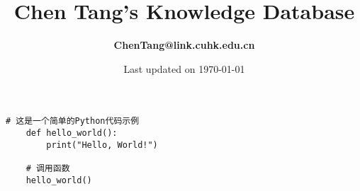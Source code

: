 \documentclass[12pt]{report}
\title{\textbf{Chen Tang's \break Knowledge Database}}
\author{\textbf{ChenTang@link.cuhk.edu.cn}}
\date{Last updated on \today}
\begin{document}
\maketitle

\clearpage
\begin{lstlisting}[caption={Your Python Code}, label={lst:python_code}]
    # 这是一个简单的Python代码示例
    def hello_world():
        print("Hello, World!")
    
    # 调用函数
    hello_world()
    \end{lstlisting}

\listoflistings
\end{document}
